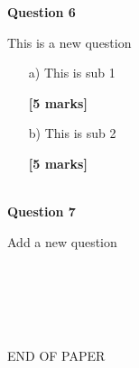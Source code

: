 \documentclass[11pt]{article}
\begin{document}
        \textbf{Question 6}

        This is a new question
        \begin{enumerate}
            
        \item[a) ]This is sub 1
        \begin{flushright}
            \textbf{[5 marks]}
        \end{flushright}
    
        \item[b) ]This is sub 2
        \begin{flushright}
            \textbf{[5 marks]}
        \end{flushright}
    
        \end{enumerate}
        ~\\
    
        \textbf{Question 7}

        Add a new question
        \begin{enumerate}
            
        \end{enumerate}
        ~\\
    
	
	
	~\\~\\~\\
	\begin{center}
		END OF PAPER
	\end{center}
	
	
	\label{unknown}
\end{document}
